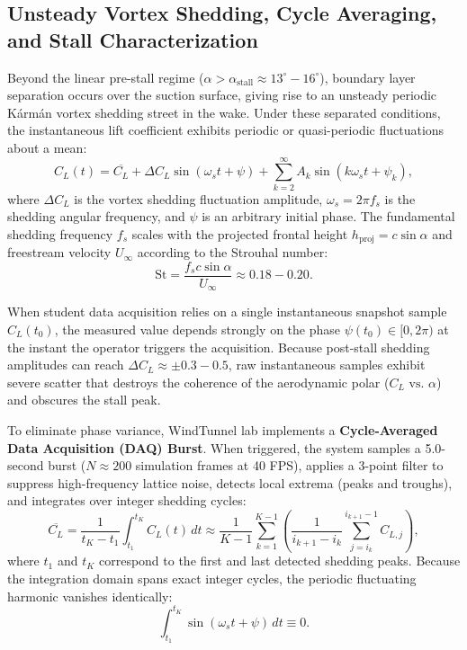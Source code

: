 \documentclass[11pt,a4paper]{article}
\begin{document}
\subsection{Unsteady Vortex Shedding, Cycle Averaging, and Stall Characterization}
Beyond the linear pre-stall regime ($\alpha > \alpha_{\text{stall}} \approx 13^\circ - 16^\circ$), boundary layer separation occurs over the suction surface, giving rise to an unsteady periodic K\'{a}rm\'{a}n vortex shedding street in the wake. Under these separated conditions, the instantaneous lift coefficient exhibits periodic or quasi-periodic fluctuations about a mean:
\begin{equation}
C_L(t) = \overline{C_L} + \Delta C_L \sin(\omega_s t + \psi) + \sum_{k=2}^\infty A_k \sin(k \omega_s t + \psi_k),
\label{eq:cl_fluctuation}
\end{equation}
where $\Delta C_L$ is the vortex shedding fluctuation amplitude, $\omega_s = 2\pi f_s$ is the shedding angular frequency, and $\psi$ is an arbitrary initial phase. The fundamental shedding frequency $f_s$ scales with the projected frontal height $h_{\text{proj}} = c \sin\alpha$ and freestream velocity $U_\infty$ according to the Strouhal number:
\begin{equation}
\mathrm{St} = \frac{f_s c \sin\alpha}{U_\infty} \approx 0.18 - 0.20.
\end{equation}

When student data acquisition relies on a single instantaneous snapshot sample $C_L(t_0)$, the measured value depends strongly on the phase $\psi(t_0) \in [0, 2\pi)$ at the instant the operator triggers the acquisition. Because post-stall shedding amplitudes can reach $\Delta C_L \approx \pm 0.3 - 0.5$, raw instantaneous samples exhibit severe scatter that destroys the coherence of the aerodynamic polar ($C_L \text{ vs. } \alpha$) and obscures the stall peak.

To eliminate phase variance, WindTunnel lab implements a \textbf{Cycle-Averaged Data Acquisition (DAQ) Burst}. When triggered, the system samples a 5.0-second burst ($N \approx 200$ simulation frames at 40 FPS), applies a 3-point filter to suppress high-frequency lattice noise, detects local extrema (peaks and troughs), and integrates over integer shedding cycles:
\begin{equation}
\overline{C_L} = \frac{1}{t_K - t_1} \int_{t_1}^{t_K} C_L(t) \, dt \approx \frac{1}{K - 1} \sum_{k=1}^{K-1} \left( \frac{1}{i_{k+1} - i_k} \sum_{j=i_k}^{i_{k+1}-1} C_{L, j} \right),
\end{equation}
where $t_1$ and $t_K$ correspond to the first and last detected shedding peaks. Because the integration domain spans exact integer cycles, the periodic fluctuating harmonic vanishes identically:
\begin{equation}
\int_{t_1}^{t_K} \sin(\omega_s t + \psi) \, dt \equiv 0.
\end{equation}
\end{document}
